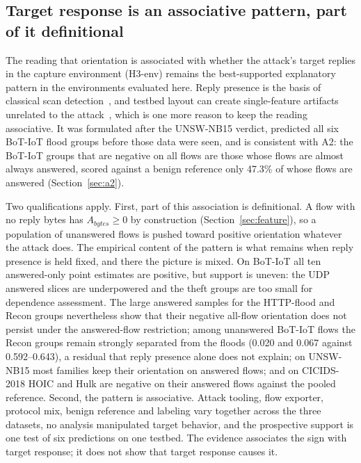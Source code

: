 \documentclass[preprint,12pt]{elsarticle}
\begin{document}
\subsection{Target response is an associative pattern, part of it definitional}\label{sec:disc-target}

The reading that orientation is associated with whether the attack's target replies in the capture environment (H3-env) remains the best-supported explanatory pattern in the environments evaluated here. Reply presence is the basis of classical scan detection~\cite{jung2004portscan}, and testbed layout can create single-feature artifacts unrelated to the attack~\cite{flood2024smells,sarhan2021featureanalysis}, which is one more reason to keep the reading associative. It was formulated after the UNSW-NB15 verdict, predicted all six BoT-IoT flood groups before those data were seen, and is consistent with A2: the BoT-IoT groups that are negative on all flows are those whose flows are almost always answered, scored against a benign reference only 47.3\% of whose flows are answered (Section~\ref{sec:a2}).

Two qualifications apply. First, part of this association is definitional. A flow with no reply bytes has $A_{bytes}\ge 0$ by construction (Section~\ref{sec:feature}), so a population of unanswered flows is pushed toward positive orientation whatever the attack does. The empirical content of the pattern is what remains when reply presence is held fixed, and there the picture is mixed. On BoT-IoT all ten answered-only point estimates are positive, but support is uneven: the UDP answered slices are underpowered and the theft groups are too small for dependence assessment. The large answered samples for the HTTP-flood and Recon groups nevertheless show that their negative all-flow orientation does not persist under the answered-flow restriction; among unanswered BoT-IoT flows the Recon groups remain strongly separated from the floods (0.020 and 0.067 against 0.592--0.643), a residual that reply presence alone does not explain; on UNSW-NB15 most families keep their orientation on answered flows; and on CICIDS-2018 HOIC and Hulk are negative on their answered flows against the pooled reference. Second, the pattern is associative. Attack tooling, flow exporter, protocol mix, benign reference and labeling vary together across the three datasets, no analysis manipulated target behavior, and the prospective support is one test of six predictions on one testbed. The evidence associates the sign with target response; it does not show that target response causes it.
\end{document}
